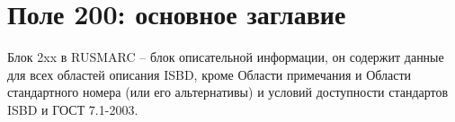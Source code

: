 \section*{Поле 200: основное заглавие}

Блок 2xx в RUSMARC -- блок описательной информации, он содержит данные для всех областей описания ISBD, кроме Области примечания и Области стандартного номера (или его альтернативы) и условий доступности стандартов ISBD и ГОСТ 7.1-2003. 
